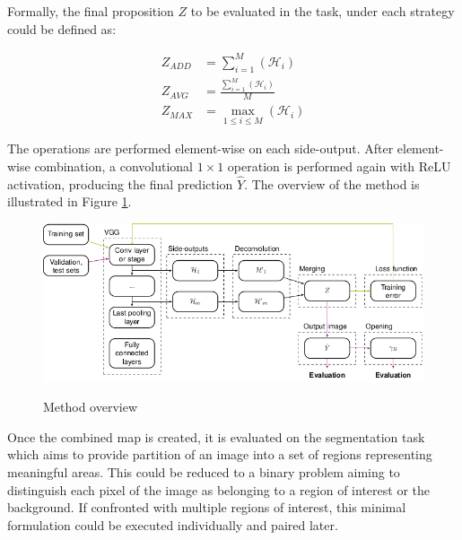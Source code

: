 Formally, the final proposition $Z$ to be evaluated in the task, under each strategy could be defined as:

\begin{align}
Z_{ADD} &= \sum_{i=1}^{M}(\mathcal{H}_i)\\
Z_{AVG} &= \frac{\sum_{i=1}^{M}(\mathcal{H}_i)}{M}\\
Z_{MAX} &= \max_{1 \leq i \leq M} (\mathcal{H}_i)
\end{align} 

The operations are performed element-wise on each side-output. After element-wise combination, a convolutional $1\times1$ operation is performed again with ReLU activation, producing the final prediction $\hat{Y}$. The overview of the method is illustrated in Figure \ref{fig:side_outputs_method}.

\begin{figure}[ht]
  \caption{Method overview}
  \centering
  \includegraphics[width=1.\columnwidth]{figures/falreis/side_outputs_method.png}
  \label{fig:side_outputs_method}
\end{figure}


Once the combined map is created, it is evaluated on the segmentation task which aims to provide partition of an image into a set of regions representing meaningful areas. This could be reduced to a binary problem aiming to distinguish each pixel of the image as belonging to a region of interest or the background. If confronted with multiple regions of interest, this minimal formulation could be executed individually and paired later. %

